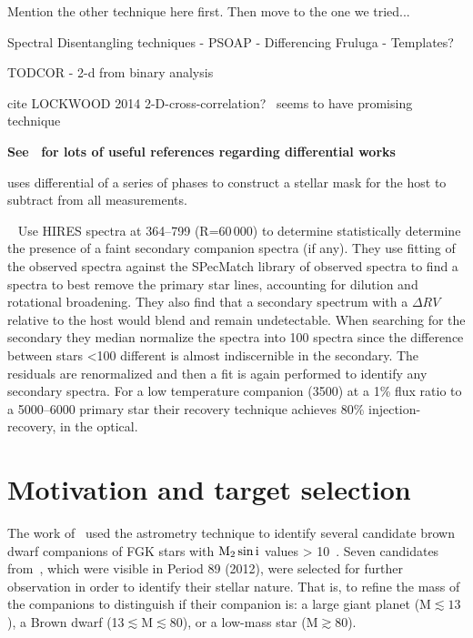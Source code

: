 Mention the other technique here first.
Then move to the one we tried...




Spectral Disentangling techniques
- PSOAP
- Differencing Fruluga
- Templates?

TODCOR - 2-d from binary analysis~\citep{zucker_study_1994}
\citep{mazeh_detecting_1997}


cite {LOCKWOOD 2014}
2-D-cross-correlation?~\citet{piskorz_evidence_2016} seems to have promising technique


\textbf{
See~\citet{kostogryz_spectral_2013} for lots of useful references regarding differential works~\citet{simon_disentangling_1994}}

\citet{rodler_weighing_2012} uses differential of a series of phases to construct a stellar mask for the host to subtract from all measurements.


{\red{}~\citet{kolbl_detection_2015} Use HIRES spectra at 364--799\nm{} (R=60\,000) to determine statistically determine the presence of a faint secondary companion spectra (if any).
They use \textchisquared{} fitting of the observed spectra against the {SPecMatch} library of observed spectra to find a spectra to best remove the primary star lines,
accounting for dilution and rotational broadening.
They also find that a secondary spectrum with a \(\Delta {RV}\) relative to the host would blend and remain undetectable.
When searching for the secondary they median normalize the spectra into 100\K{} spectra since the difference between stars  <100\K{} different is almost indiscernible in the secondary.
The residuals are renormalized and then a \textchisquared{} fit is again performed to identify any secondary spectra.
For a low temperature companion (3500\K{}) at a 1\% flux ratio to a 5000--6000\K{} primary star their recovery technique achieves 80\% injection-recovery, in the optical.}


\section{Motivation and target selection}
\label{sec:target_motivation}

The work of~\citet{sahlmann_search_2011} used the astrometry technique to identify several candidate brown dwarf companions of {FGK} stars with \(\rm M_2 \sin{i}\) values > 10~\Mjup{}.
Seven candidates from~\citet{sahlmann_search_2011}, which were visible in {Period 89} (2012), were selected for further observation in order to identify their stellar nature.
That is, to refine the mass of the companions to distinguish if their companion is: a large giant planet (M$\apprle13$\Mjup), a Brown dwarf (13$\apprle $M$\apprle80$\Mjup), or a low-mass star (M$\apprge80$\Mjup).

